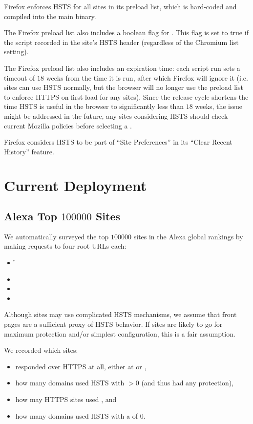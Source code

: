 \documentclass{acm_proc_article-sp}
\begin{document}
Firefox enforces HSTS for all sites in its preload list, which is hard-coded and compiled into the main binary.

The Firefox preload list also includes a boolean flag for \iSD. This flag is set to true if the script recorded {\iSD} in the site's HSTS header (regardless of the Chromium list setting).

The Firefox preload list also includes an expiration time: each script run sets a timeout of $18$ weeks from the time it is run, after which Firefox will ignore it (i.e. sites can use HSTS normally, but the browser will no longer use the preload list to enforce HTTPS on first load for any sites)\cite{firefox-cron-expiration}. Since the release cycle shortens the time HSTS is useful in the browser to significantly less than $18$ weeks, the issue might be addressed in the future, any sites considering HSTS should check current Mozilla policies before selecting a {\ma}.

Firefox considers HSTS to be part of ``Site Preferences'' in its ``Clear Recent History'' feature.

\section{Current Deployment}

\subsection{Alexa Top $100000$ Sites}

We automatically surveyed the top $100000$ sites in the Alexa global rankings\cite{alexa} by making  requests to four root URLs each:

\begin{itemize}
\item {\h}
\item {\hw}
\item {\s}
\item {\sw}
\end{itemize}

Although sites may use complicated HSTS mechanisms, we assume that front pages are a sufficient proxy of HSTS behavior. If sites are likely to go for maximum protection and/or simplest configuration, this is a fair assumption.

We recorded which sites:

\begin{itemize}
\item responded over HTTPS at all, either at {\s} or {\sw},
\item how many domains used HSTS with {\ma}$>0$ (and thus had any protection),
\item how may HTTPS sites used {\iSD}, and
\item how many domains used HSTS with a {\ma} of $0$.
\end{itemize}
\end{document}
